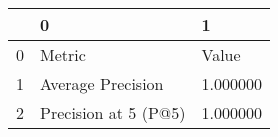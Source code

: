 \begin{tabular}{lll}
\toprule
 & 0 & 1 \\
\midrule
0 & Metric & Value \\
1 & Average Precision & 1.000000 \\
2 & Precision at 5 (P@5) & 1.000000 \\
\bottomrule
\end{tabular}
